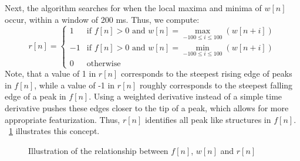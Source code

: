 \documentclass[conference]{IEEEtran}
\begin{document}
Next, the algorithm searches for when the local
maxima and minima of $w[n]$ occur, within a window of
200 ms. Thus, we compute:
\begin{equation*}
	r[n] = \left \{
		\begin{array}{lc}
			1 & \text{if } f[n]>0 \text{ and } w[n] = \max\limits_{-100 \le i \le 100} (w[n+i]) \\
			-1 & \text{if } f[n]>0 \text{ and }  w[n] = \min\limits_{-100 \le i \le 100} (w[n+i]) \\
			0 & \text{otherwise}
		\end{array}
	\right.
\end{equation*}
Note, that a value of 1 in $r[n]$ corresponds to the
steepest rising edge of peaks in $f[n]$, while a value of -1
in $r[n]$ roughly corresponds to the steepest falling edge of a peak
in $f[n]$. Using a weighted derivative instead of a simple time derivative pushes these edges closer to the tip of a peak, which allows for more appropriate featurization.
Thus, $r[n]$ identifies all peak like structures in
$f[n]$.  \figurename~\ref{fig:fwr} illustrates this concept.
\begin{figure}
	\centering
	\caption{
	Illustration of the relationship between $f[n]$, $w[n]$ and $r[n]$}
	\label{fig:fwr}
\end{figure}
\end{document}
